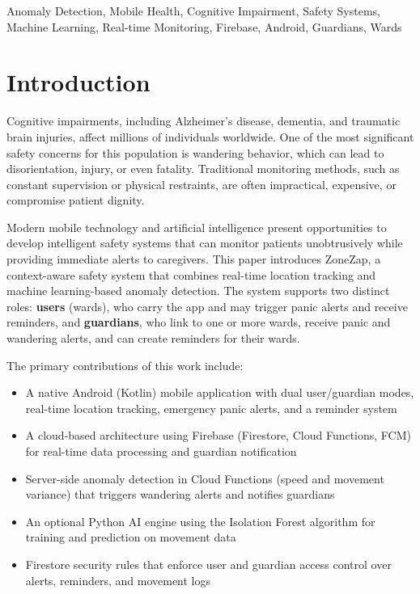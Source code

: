 \documentclass[conference]{IEEEtran}
\begin{document}
\begin{IEEEkeywords}
Anomaly Detection, Mobile Health, Cognitive Impairment, Safety Systems, Machine Learning, Real-time Monitoring, Firebase, Android, Guardians, Wards
\end{IEEEkeywords}

\section{Introduction}

Cognitive impairments, including Alzheimer's disease, dementia, and traumatic brain injuries, affect millions of individuals worldwide. One of the most significant safety concerns for this population is wandering behavior, which can lead to disorientation, injury, or even fatality. Traditional monitoring methods, such as constant supervision or physical restraints, are often impractical, expensive, or compromise patient dignity.

Modern mobile technology and artificial intelligence present opportunities to develop intelligent safety systems that can monitor patients unobtrusively while providing immediate alerts to caregivers. This paper introduces ZoneZap, a context-aware safety system that combines real-time location tracking and machine learning-based anomaly detection. The system supports two distinct roles: \textbf{users} (wards), who carry the app and may trigger panic alerts and receive reminders, and \textbf{guardians}, who link to one or more wards, receive panic and wandering alerts, and can create reminders for their wards.

The primary contributions of this work include:
\begin{itemize}
    \item A native Android (Kotlin) mobile application with dual user/guardian modes, real-time location tracking, emergency panic alerts, and a reminder system
    \item A cloud-based architecture using Firebase (Firestore, Cloud Functions, FCM) for real-time data processing and guardian notification
    \item Server-side anomaly detection in Cloud Functions (speed and movement variance) that triggers wandering alerts and notifies guardians
    \item An optional Python AI engine using the Isolation Forest algorithm for training and prediction on movement data
    \item Firestore security rules that enforce user and guardian access control over alerts, reminders, and movement logs
\end{itemize}
\end{document}
